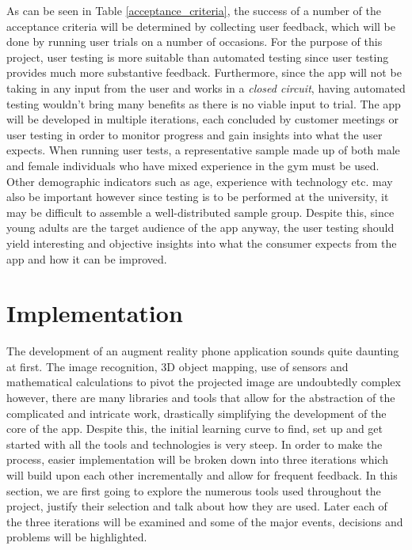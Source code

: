 \documentclass{l4proj}
\begin{document}
As can be seen in Table \ref{acceptance_criteria}, the success of a number of the acceptance criteria will be determined by collecting user feedback, which will be done by running user trials on a number of occasions. For the purpose of this project, user testing is more suitable than automated testing since user testing provides much more substantive feedback. Furthermore, since the app will not be taking in any input from the user and works in a \textit{closed circuit}, having automated testing wouldn't bring many benefits as there is no viable input to trial. The app will be developed in multiple iterations, each concluded by customer meetings or user testing in order to monitor progress and gain insights into what the user expects.  When running user tests, a representative sample made up of both male and female individuals who have mixed experience in the gym must be used. Other demographic indicators such as age, experience with technology etc. may also be important however since testing is to be performed at the university, it may be difficult to assemble a well-distributed sample group. Despite this, since young adults are the target audience of the app anyway, the user testing should yield interesting and objective insights into what the consumer expects from the app and how it can be improved. 


\chapter{Implementation}
\label{chapter:implementation}
The development of an augment reality phone application sounds quite daunting at first. The image recognition, 3D object mapping, use of sensors and mathematical calculations to pivot the projected image are undoubtedly complex however, there are many libraries and tools that allow for the abstraction of the complicated and intricate work, drastically simplifying the development of the core of the app. Despite this, the initial learning curve to find, set up and get started with all the tools and technologies is very steep. In order to make the process, easier implementation will be broken down into three iterations which will build upon each other incrementally and allow for frequent feedback. In this section, we are first going to explore the numerous tools used throughout the project, justify their selection and talk about how they are used. Later each of the three iterations will be examined and some of the major events, decisions and problems will be highlighted.
\end{document}
